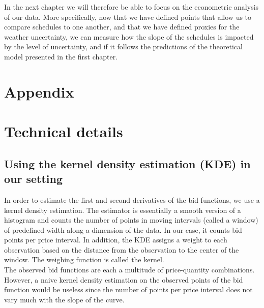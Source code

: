 In the next chapter we will therefore be able to focus on the econometric analysis of our data. More specifically, now that we have defined points that allow us to compare schedules to one another, and that we have defined proxies for the weather uncertainty, we can measure how the slope of the schedules is impacted by the level of uncertainty, and if it follows the predictions of the theoretical model presented in the first chapter.

\newpage
\begin{subappendices}
\section*{Appendix}

\section{Technical details}
\label{Techdetails}

\subsection{Using the kernel density estimation (KDE) in our setting}
\label{implementingkernel}
In order to estimate the first and second derivatives of the bid functions, we use a kernel density estimation. The estimator is essentially a smooth version of a histogram and counts the number of points in moving intervals (called a window) of predefined width along a dimension of the data. In our case, it counts bid points per price interval. In addition, the KDE assigns a weight to each observation based on the distance from the observation to the center of the window. The weighing function is called the kernel. \\

The observed bid functions are each a multitude of price-quantity combinations. However, a naive kernel density estimation on the observed points of the bid function would be useless since the number of points per price interval does not vary much with the slope of the curve. \\


\end{subappendices}
